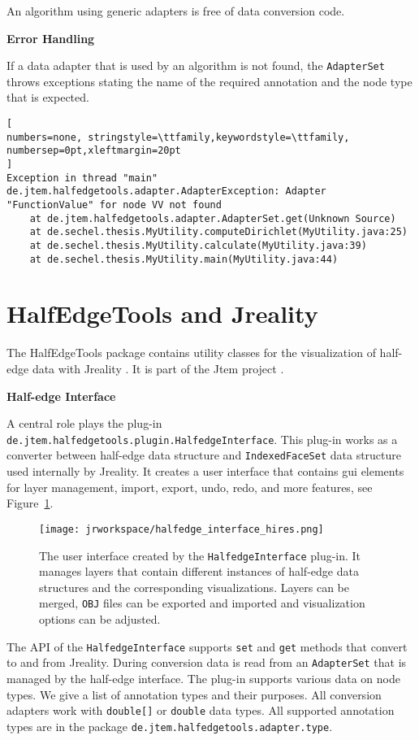 \documentclass[Thesis.tex]{subfiles}
\begin{document}
An algorithm using generic adapters is free of data conversion code.


{\bf Error Handling}

If a data adapter that is used by an algorithm is not found, the {\tt AdapterSet} throws exceptions stating
the name of the required annotation and the node type that is expected. 

\begin{lstlisting}[
numbers=none, stringstyle=\ttfamily,keywordstyle=\ttfamily, numbersep=0pt,xleftmargin=20pt
]
Exception in thread "main" de.jtem.halfedgetools.adapter.AdapterException: Adapter "FunctionValue" for node VV not found
	at de.jtem.halfedgetools.adapter.AdapterSet.get(Unknown Source)
	at de.sechel.thesis.MyUtility.computeDirichlet(MyUtility.java:25)
	at de.sechel.thesis.MyUtility.calculate(MyUtility.java:39)
	at de.sechel.thesis.MyUtility.main(MyUtility.java:44)
\end{lstlisting}


\section{{\sc HalfEdgeTools} and {\sc Jreality}}

The {\sc HalfEdgeTools} package contains utility classes for the visualization of half-edge data with 
{\sc Jreality} \cite{JrealityWebsite}. It is part of the {\sc Jtem} project \cite{JtemWebsite}. 

{\bf Half-edge Interface}

A central role plays the plug-in {\tt de.jtem.halfedge\-tools.plugin.Halfedge\-Interface}. This plug-in works 
as a converter between half-edge data structure and {\tt IndexedFaceSet} data structure used internally 
by {\sc Jreality}. It creates a user interface that contains gui elements for layer management, import, export,
undo, redo, and more features, see Figure~\ref{fig:halfedge_interface}.

\begin{figure}
	\centering
	\texttt{[image: jrworkspace/halfedge\_interface\_hires.png]}
	\caption{The user interface created by the {\tt HalfedgeInterface} plug-in. It manages layers that
		contain different instances of half-edge data structures and the corresponding visualizations.
		Layers can be merged, {\tt OBJ} files can be exported and imported and visualization
		options can be adjusted. 
	}
	\label{fig:halfedge_interface}
\end{figure}

The API of the {\tt HalfedgeInterface} supports {\tt set} and {\tt get} methods that convert to and from
{\sc Jreality}. During conversion data is read from an {\tt AdapterSet} that is managed by the half-edge
interface. The plug-in supports various data on node types. We give a list of annotation types and
their purposes. All conversion adapters work with {\tt double[]} or {\tt double} data types. All
supported annotation types are in the package {\tt de.jtem.halfedgetools.adapter.type}.
\end{document}
